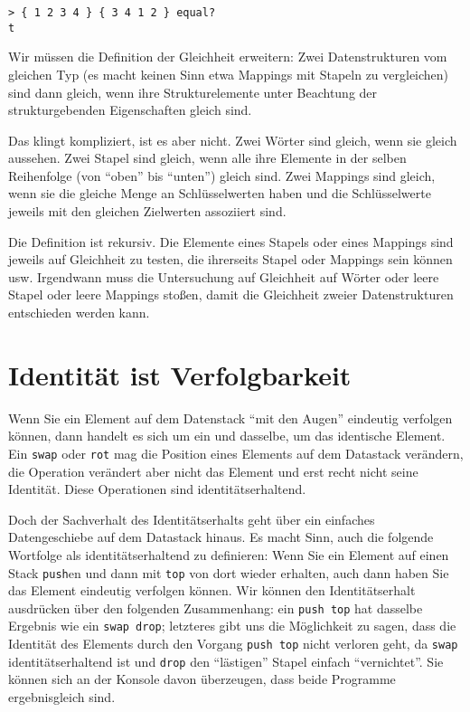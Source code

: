 \begin{verbatim}
> { 1 2 3 4 } { 3 4 1 2 } equal?
t
\end{verbatim}

Wir müssen die Definition der Gleichheit erweitern: Zwei Datenstrukturen vom gleichen Typ (es macht keinen Sinn etwa Mappings mit Stapeln zu vergleichen) sind dann gleich, wenn ihre Strukturelemente unter Beachtung der strukturgebenden Eigenschaften gleich sind.

Das klingt kompliziert, ist es aber nicht. Zwei Wörter sind gleich, wenn sie gleich aussehen. Zwei Stapel sind gleich, wenn alle ihre Elemente in der selben Reihenfolge (von "`oben"' bis "`unten"') gleich sind. Zwei Mappings sind gleich, wenn sie die gleiche Menge an Schlüsselwerten haben und die Schlüsselwerte jeweils mit den gleichen Zielwerten assoziiert sind.

Die Definition ist rekursiv. Die Elemente eines Stapels oder eines Mappings sind jeweils auf Gleichheit zu testen, die ihrerseits Stapel oder Mappings sein können usw. Irgendwann muss die Untersuchung auf Gleichheit auf Wörter oder leere Stapel oder leere Mappings stoßen, damit die Gleichheit zweier Datenstrukturen entschieden werden kann.

\section{Identität ist Verfolgbarkeit}

Wenn Sie ein Element auf dem Datenstack "`mit den Augen"' eindeutig verfolgen können, dann handelt es sich um ein und dasselbe, um das identische Element. Ein \verb|swap| oder \verb|rot| mag die Position eines Elements auf dem Datastack verändern, die Operation verändert aber nicht das Element und erst recht nicht seine Identität. Diese Operationen sind identitätserhaltend.

Doch der Sachverhalt des Identitätserhalts geht über ein einfaches Datengeschiebe auf dem Datastack hinaus. Es macht Sinn, auch die folgende Wortfolge als identitätserhaltend zu definieren: Wenn Sie ein Element auf einen Stack \verb|push|en und dann mit \verb|top| von dort wieder erhalten, auch dann haben Sie das Element eindeutig verfolgen können. Wir können den Identitätserhalt ausdrücken über den folgenden Zusammenhang: ein \verb|push top| hat dasselbe Ergebnis wie ein \verb|swap drop|; letzteres gibt uns die Möglichkeit zu sagen, dass die Identität des Elements durch den Vorgang \verb|push top| nicht verloren geht, da \verb|swap| identitätserhaltend ist und \verb|drop| den "`lästigen"' Stapel einfach "`vernichtet"'. Sie können sich an der Konsole davon überzeugen, dass beide Programme ergebnisgleich sind.

